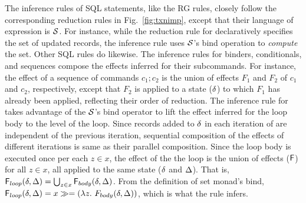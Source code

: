 The inference rules of SQL statements, like the RG rules, closely
follow the corresponding reduction rules in Fig.~\ref{fig:txnimp},
except that their language of expression is $\mathcal{S}$. For instance, while
the reduction rule for  declaratively specifies the set of
updated records, the inference rule uses $\mathcal{S}$'s bind operation to
\emph{compute} the set. Other SQL rules do likewise. The inference
rules for  binders, conditionals, and sequences compose the
effects inferred for their subcommands. For instance, the effect of a
sequence of commands $c_1;c_2$ is the union of effects $F_1$ and $F_2$
of $c_1$ and $c_2$, respectively, except that $F_2$ is applied to a
state ($\delta$) to which $F_1$ has already been applied, reflecting
their order of reduction. The inference rule for  takes
advantage of the $\mathcal{S}$'s bind operator to lift the effect inferred for
the loop body to the level of the loop. Since records added to $\delta$
in each iteration of  are independent of the previous
iteration, sequential composition of the effects of different
iterations is same as their parallel composition. Since the loop body
is executed once per each $z\in x$, the effect of the the loop is the
union of effects (${\sf F}$) for all $z\in x$, all applied to the same
state ($\delta$ and $\Delta$). That is, ${\sf F}_{loop}(\delta,\Delta) =
\bigcup_{z\in x}{\sf F}_{body}(\delta,\Delta)$. From the definition of
set monad's bind, ${\sf F}_{loop}(\delta,\Delta) = x \gg= (\lambda
z.~F_{body}(\delta,\Delta))$, which is what the rule infers.


